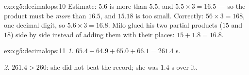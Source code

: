\begin{solution}{exo:g5:decimalops:10}
Estimate: $5.6$ is more than $5.5$, and $5.5 \times 3 = 16.5$ --- so
the product must be \emph{more} than $16.5$, and $15.18$ is too
small. Correctly: $56 \times 3 = 168$, one decimal digit, so
$5.6 \times 3 = 16.8$. Milo glued his two partial products ($15$ and
$18$) side by side instead of adding them with their places:
$15 + 1.8 = 16.8$.
\end{solution}

\begin{solution}{exo:g5:decimalops:11}
\emph{1.} $65.4 + 64.9 + 65.0 + 66.1 = 261.4$ s.

\emph{2.} $261.4 > 260$: she did not beat the record; she was
$1.4$ s over it.
\end{solution}
